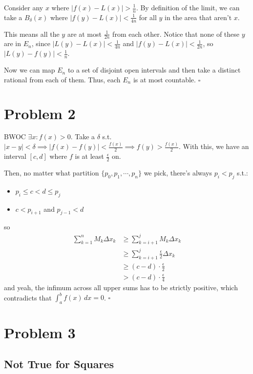 \documentclass[12pt]{article}
\begin{document}
Consider any $x$ where $|f(x)-L(x)| > \frac{1}{n}$.
By definition of the limit, we can take a $B_\delta(x)$
where $|f(y)-L(x)| < \frac{1}{4n}$ for all $y$ in the area that aren't $x$.

This means all the $y$ are at most $\frac{1}{2n}$ from each other.
Notice that none of these $y$ are in $E_n$, since $|L(y)-L(x)| < \frac{1}{4n}$
and $|f(y)-L(x)| < \frac{1}{2n}$, so $|L(y)-f(y)| < \frac{1}{n}$.

Now we can map $E_n$ to a set of disjoint open intervals
and then take a distinct rational from each of them.
Thus, each $E_n$ is at most countable. $\square$

\pagebreak

\section{Problem 2}

BWOC $\exists x: f(x) > 0$.
Take a $\delta$ s.t. $|x-y| < \delta \implies |f(x)-f(y)| < \frac{f(x)}{2} \implies f(y) > \frac{f(x)}{2}$.
With this, we have an interval $[c, d]$ where $f$ is at least $\frac{\epsilon}{2}$ on.

Then, no matter what partition $\{p_0, p_1, \cdots, p_n\}$
we pick, there's always $p_i < p_j$ s.t.:
\begin{itemize}[nolistsep]
  \item $p_i \le c < d \le p_j$
  \item $c < p_{i+1}$ and $p_{j-1} < d$
\end{itemize}
so
\begin{align*}
  \sum_{k=1}^{n} M_k \Delta x_k
   & \ge \sum_{k=i+1}^{j} M_k \Delta x_k                \\
   & \ge \sum_{k=i+1}^{j} \frac{\epsilon}{2} \Delta x_k \\
   & \ge (c-d) \cdot \frac{\epsilon}{2}                 \\
   & > (c-d) \cdot \frac{\epsilon}{4}
\end{align*}
and yeah, the infimum across all upper sums has to be strictly positive,
which contradicts that $\int_{a}^{b} f(x)\,dx=0$. $\square$

\pagebreak

\section{Problem 3}

\subsection{Not True for Squares}
\end{document}
